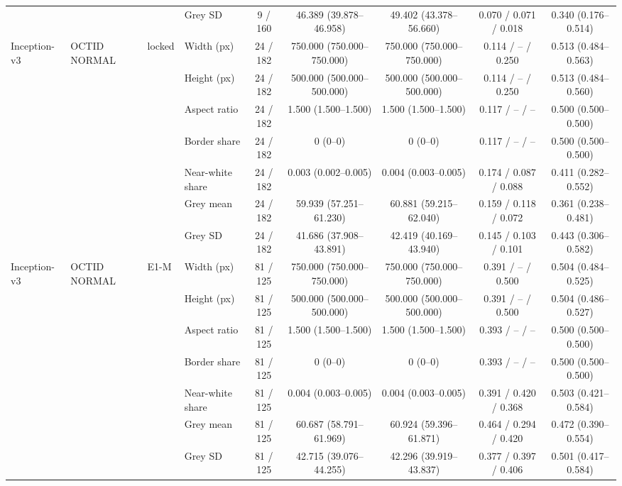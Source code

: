 \begin{longtable}{@{}llllccccc@{}}
 &  &  & Grey SD & 9 / 160 & 46.389 (39.878--46.958) & 49.402 (43.378--56.660) & 0.070 / 0.071 / 0.018 & 0.340 (0.176--0.514) \\
\addlinespace[1pt]
Inception-v3 & OCTID NORMAL & locked & Width (px) & 24 / 182 & 750.000 (750.000--750.000) & 750.000 (750.000--750.000) & 0.114 / -- / 0.250 & 0.513 (0.484--0.563) \\
 &  &  & Height (px) & 24 / 182 & 500.000 (500.000--500.000) & 500.000 (500.000--500.000) & 0.114 / -- / 0.250 & 0.513 (0.484--0.560) \\
 &  &  & Aspect ratio & 24 / 182 & 1.500 (1.500--1.500) & 1.500 (1.500--1.500) & 0.117 / -- / -- & 0.500 (0.500--0.500) \\
 &  &  & Border share & 24 / 182 & 0 (0--0) & 0 (0--0) & 0.117 / -- / -- & 0.500 (0.500--0.500) \\
 &  &  & Near-white share & 24 / 182 & 0.003 (0.002--0.005) & 0.004 (0.003--0.005) & 0.174 / 0.087 / 0.088 & 0.411 (0.282--0.552) \\
 &  &  & Grey mean & 24 / 182 & 59.939 (57.251--61.230) & 60.881 (59.215--62.040) & 0.159 / 0.118 / 0.072 & 0.361 (0.238--0.481) \\
 &  &  & Grey SD & 24 / 182 & 41.686 (37.908--43.891) & 42.419 (40.169--43.940) & 0.145 / 0.103 / 0.101 & 0.443 (0.306--0.582) \\
\addlinespace[1pt]
Inception-v3 & OCTID NORMAL & E1-M & Width (px) & 81 / 125 & 750.000 (750.000--750.000) & 750.000 (750.000--750.000) & 0.391 / -- / 0.500 & 0.504 (0.484--0.525) \\
 &  &  & Height (px) & 81 / 125 & 500.000 (500.000--500.000) & 500.000 (500.000--500.000) & 0.391 / -- / 0.500 & 0.504 (0.486--0.527) \\
 &  &  & Aspect ratio & 81 / 125 & 1.500 (1.500--1.500) & 1.500 (1.500--1.500) & 0.393 / -- / -- & 0.500 (0.500--0.500) \\
 &  &  & Border share & 81 / 125 & 0 (0--0) & 0 (0--0) & 0.393 / -- / -- & 0.500 (0.500--0.500) \\
 &  &  & Near-white share & 81 / 125 & 0.004 (0.003--0.005) & 0.004 (0.003--0.005) & 0.391 / 0.420 / 0.368 & 0.503 (0.421--0.584) \\
 &  &  & Grey mean & 81 / 125 & 60.687 (58.791--61.969) & 60.924 (59.396--61.871) & 0.464 / 0.294 / 0.420 & 0.472 (0.390--0.554) \\
 &  &  & Grey SD & 81 / 125 & 42.715 (39.076--44.255) & 42.296 (39.919--43.837) & 0.377 / 0.397 / 0.406 & 0.501 (0.417--0.584) \\

\end{longtable}
